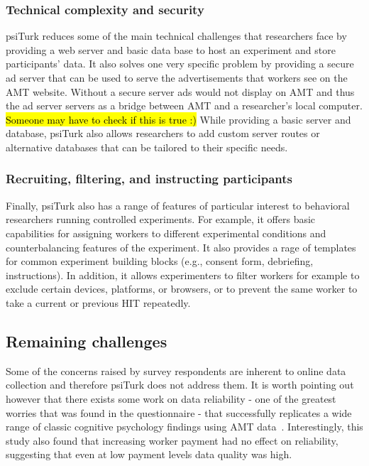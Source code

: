 \documentclass[twocolumn]{svjour3}          %
\begin{document}
\subsubsection{Technical complexity and security}
psiTurk reduces some of the main technical challenges that researchers face by providing a 
web server and basic data base to host an experiment and store participants' data. 
It also solves one very specific problem by providing a secure ad server that can
be used to serve the advertisements that workers see on the AMT website. Without  a secure server
 ads would not display on AMT and thus the ad server servers as a bridge between AMT and 
 a researcher's local computer. \hl{Someone may have to check if this is true :)} 
While providing a basic server and database, psiTurk also allows researchers to add custom
server routes or alternative databases that can be tailored to their specific needs. 


\subsubsection{Recruiting, filtering, and instructing participants}
Finally, psiTurk also has a range of features of particular interest to behavioral researchers
running controlled experiments. 
For example, it offers basic capabilities for assigning workers to different experimental conditions 
and counterbalancing features of the experiment. It also provides  a rage of templates
for common experiment building blocks (e.g., consent form, debriefing, instructions).
In addition, it allows experimenters to filter workers for example to exclude certain devices, platforms, or browsers, 
or to prevent the same worker to take a current or previous HIT repeatedly.





\subsection{Remaining challenges}
Some of the concerns raised by survey respondents are inherent to online data collection and therefore psiTurk does
not address them.
It is worth pointing out however that there exists some work on data reliability - one of the greatest worries that was found
in the questionnaire - that successfully replicates a wide range of classic cognitive psychology findings using AMT data~\citep{crump2013evaluating}. Interestingly, this study also found that increasing worker payment had no effect on reliability, suggesting that even 
at low payment levels data quality was high. 
\end{document}
